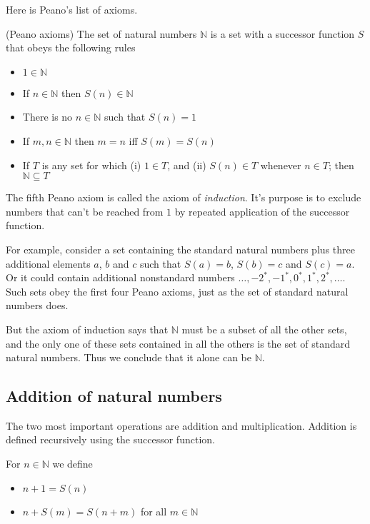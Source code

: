 \documentclass[10pt]{article}
\newcommand{\N}{\mathbb{N}}
\newenvironment{definition}[1][Definition]{\begin{trivlist}
\item[\hskip \labelsep {\bfseries #1}]}{\end{trivlist}}
\begin{document}
Here is Peano's list of axioms.

\begin{definition} (Peano axioms)
The set of natural numbers $\N$ is a set with a successor function $S$ that obeys the following rules
\begin{itemize}
\item $1 \in \N$
\item If $n \in \N$ then $S(n) \in \N$
\item There is no $n \in \N$ such that $S(n) = 1$
\item If $m, n \in \N$ then $m = n$ iff $S(m) = S(n)$
\item If $T$ is any set for which (i) $1 \in T$, and (ii) $S(n) \in T$ whenever $n \in T$; then $\N \subseteq T$
\end{itemize}
\end{definition}

The fifth Peano axiom is called the axiom of \emph{induction}. It's purpose is to exclude numbers that can't be reached from $1$ by repeated application of the successor function.

For example, consider a set containing the standard natural numbers plus three additional elements $a$, $b$ and $c$ such that $S(a) = b$, $S(b) = c$ and $S(c) = a$. Or it could contain additional nonstandard numbers $\ldots, -2^*, -1^*, 0^*, 1^*, 2^*, \ldots$. Such sets obey the first four Peano axioms, just as the set of standard natural numbers does.

But the axiom of induction says that $\N$ must be a subset of all the other sets, and the only one of these sets contained in all the others is the set of standard natural numbers. Thus we conclude that it alone can be $\N$.

\subsection{Addition of natural numbers}

The two most important operations are addition and multiplication. Addition is defined recursively using the successor function.

\begin{definition}
For $n \in \N$ we define
\begin{itemize}
\item $n + 1 = S(n)$
\item $n + S(m) = S(n + m)$ for all $m \in \N$
\end{itemize}
\end{definition}
\end{document}
